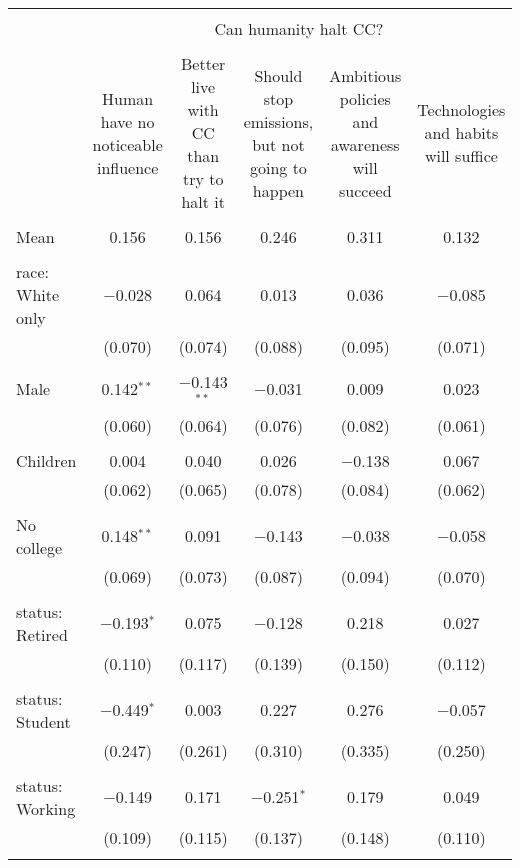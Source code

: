 
\begin{tabular}{@{\extracolsep{5pt}}lccccc} 
\\[-1.8ex]\hline 
\hline \\[-1.8ex] 
 & \multicolumn{5}{c}{Can humanity halt CC?} \\ 
\cline{2-6} 
\\[-1.8ex] & Human have no noticeable influence & Better live with CC than try to halt it & Should stop emissions, but not going to happen & Ambitious policies and awareness will succeed & Technologies and habits will suffice \\ 
\hline \\[-1.8ex] 
 Mean & 0.156 & 0.156 & 0.246 & 0.311 & 0.132  \\ \hline \\[-1.8ex] race: White only & $-$0.028 & 0.064 & 0.013 & 0.036 & $-$0.085 \\ 
  & (0.070) & (0.074) & (0.088) & (0.095) & (0.071) \\ 
  & & & & & \\ 
 Male & 0.142$^{**}$ & $-$0.143$^{**}$ & $-$0.031 & 0.009 & 0.023 \\ 
  & (0.060) & (0.064) & (0.076) & (0.082) & (0.061) \\ 
  & & & & & \\ 
 Children & 0.004 & 0.040 & 0.026 & $-$0.138 & 0.067 \\ 
  & (0.062) & (0.065) & (0.078) & (0.084) & (0.062) \\ 
  & & & & & \\ 
 No college & 0.148$^{**}$ & 0.091 & $-$0.143 & $-$0.038 & $-$0.058 \\ 
  & (0.069) & (0.073) & (0.087) & (0.094) & (0.070) \\ 
  & & & & & \\ 
 status: Retired & $-$0.193$^{*}$ & 0.075 & $-$0.128 & 0.218 & 0.027 \\ 
  & (0.110) & (0.117) & (0.139) & (0.150) & (0.112) \\ 
  & & & & & \\ 
 status: Student & $-$0.449$^{*}$ & 0.003 & 0.227 & 0.276 & $-$0.057 \\ 
  & (0.247) & (0.261) & (0.310) & (0.335) & (0.250) \\ 
  & & & & & \\ 
 status: Working & $-$0.149 & 0.171 & $-$0.251$^{*}$ & 0.179 & 0.049 \\ 
  & (0.109) & (0.115) & (0.137) & (0.148) & (0.110) \\ 
  & & & & & \\ 

\end{tabular}
